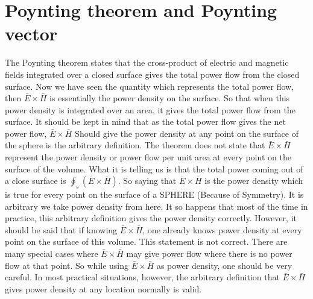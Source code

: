 \section{Poynting theorem and Poynting vector}
The Poynting theorem states that the cross-product of electric and magnetic fields integrated over a closed surface gives the total power flow from the closed surface. Now we have seen the quantity which represents the total power flow, then $\bar{E}\times\bar{H}$ is essentially the power density on the surface. So that when this power density is integrated over an area, it gives the total power flow from the surface. It should be kept in mind that as the total power flow gives the net power flow, $\bar{E}\times\bar{H}$ Should give the power density at any point on the surface of the sphere is the arbitrary definition.  The theorem does not state that $\bar{E}\times\bar{H}$ represent the power density or power flow per unit area at every point on the surface of the volume. What it is telling us is that the total power coming out of a close surface is $\oint_{s}(\bar{E}\times\bar{H})$. So saying that $\bar{E}\times\bar{H}$ is the power density which is true for every point on the surface of a SPHERE (Because of Symmetry). It is arbitrary we take power density from here. It so happens that most of the time in practice, this arbitrary definition gives the power density correctly. However, it should be said that if knowing $\bar{E}\times\bar{H}$, one already knows power density at every point on the surface of this volume. This statement is not correct. There are many special cases where $\bar{E}\times\bar{H}$  may give power flow where there is no power flow at that point. So while using $\bar{E}\times\bar{H}$  as power density, one should be very careful. In most practical situations, however, the arbitrary definition that $\bar{E}\times\bar{H}$  gives power density at any location normally is valid.

